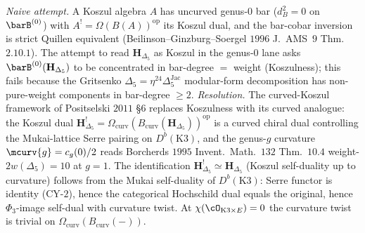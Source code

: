 \begin{proposition}
\label{prop:hochcalc-hdelta5-inversion-III}
\emph{Naive attempt.} A Koszul algebra $A$ has uncurved genus-$0$ bar
($d_B^2=0$ on $\barB^{(0)}$) with $A^!=\Omega(B(A))^{\mathrm{op}}$
its Koszul dual, and the bar-cobar inversion is strict Quillen
equivalent (Beilinson--Ginzburg--Soergel $1996$ J.\ AMS~$9$
Thm.\ $2.10.1$). The attempt to read $\mathbf H_{\Delta_5}$ as
Koszul in the genus-$0$ lane asks $\barB^{(0)}(\mathbf
H_{\Delta_5})$ to be concentrated in bar-degree $=$ weight
(Koszulness); this fails because the Gritsenko
$\Delta_5=\eta^{24}\Delta_5^{\mathrm{Jac}}$ modular-form decomposition
has non-pure-weight components in bar-degree $\ge 2$. \emph{Resolution.}
The curved-Koszul framework of Positselski $2011$ \S$6$ replaces
Koszulness with its curved analogue: the Koszul dual
$\mathbf H_{\Delta_5}^!=\Omega_{\mathrm{curv}}(B_{\mathrm{curv}}(\mathbf
H_{\Delta_5}))^{\mathrm{op}}$ is a curved chiral dual controlling
the Mukai-lattice Serre pairing on $D^b(\mathrm K3)$, and the
genus-$g$ curvature $\mcurv{g}=c_g(0)/2$ reads Borcherds $1995$
Invent.\ Math.\ $132$ Thm.\ $10.4$ weight-$2w(\Delta_5)=10$ at
$g=1$. The identification $\mathbf H_{\Delta_5}^!\simeq\mathbf
H_{\Delta_5}$ (Koszul self-duality up to curvature) follows from
the Mukai self-duality of $D^b(\mathrm K3)$: Serre functor is
identity (CY-$2$), hence the categorical Hochschild dual equals
the original, hence $\Phi_3$-image self-dual with curvature
twist. At $\chi(\cO_{\mathrm K3\times E})=0$ the curvature twist
is trivial on $\Omega_{\mathrm{curv}}(B_{\mathrm{curv}}(-))$.
\end{proposition}

